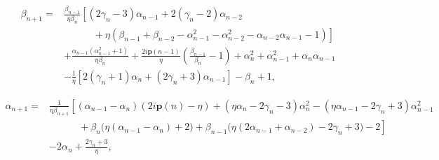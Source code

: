 \documentclass[10pt,a4paper]{amsart}
\begin{document}
\begin{equation}\label{diffbt-1}
\begin{aligned}
			\beta_{n+1}
=& \frac{\beta_{n-1}}{\eta\beta_{n}}\left[(2\gamma_{n}-3)\alpha_{n-1}+2(\gamma_{n}-2)\alpha_{n-2}\right.\\
&\left.\qquad\quad+\eta\left(\beta_{n-1}+\beta_{n-2}-\alpha_{n-1}^2-\alpha_{n-2}^2-\alpha_{n-2}\alpha_{n-1}-1\right)\right]\\
&+\frac{\alpha_{n-1}(\alpha_{n-1}^2+1) }{\eta\beta_{n}}+\frac{2i\textbf{p}(n-1)}{\eta}\left(\frac{\beta_{n-1}}{\beta_{n}}-1\right)+\alpha_{n}^2+\alpha_{n-1}^2+\alpha_{n}\alpha_{n-1}\\
&-\frac{1}{\eta}\left[2(\gamma_{n}+1)\alpha_{n}+(2\gamma_{n}+3)\alpha_{n-1}\right]-\beta_{n}+1,
\end{aligned}
\end{equation}

\begin{equation}\label{diffal-1}
\begin{aligned} \alpha_{n+1}=&\frac{1}{\eta\beta_{n+1}}\left[\left(\alpha_{n-1}-\alpha_{n}\right)\left(2\mathit{i}\textbf{p}(n)-\eta\right)+\left(\eta\alpha_{n}-2\gamma_{n}-3\right)\alpha_{n}^2-\left(\eta\alpha_{n-1}-2\gamma_{n}+3\right)\alpha_{n-1}^2\right.\\
&\left.\qquad\quad			 +\beta_{n}\big(\eta(\alpha_{n-1}-\alpha_{n})+2\big)+\beta_{n-1}\big(\eta (2\alpha_{n-1}+\alpha_{n-2})-2\gamma_{n}+3\big)-2\right]\\
&-2\alpha_{n}+\frac{2\gamma_{n}+3}{\eta},
\end{aligned}
\end{equation}	
\end{document}
